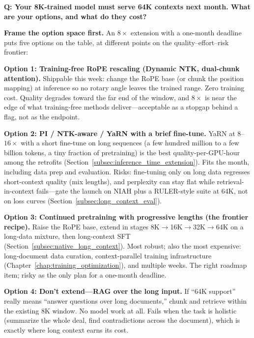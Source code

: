 \begin{interviewq}
\textbf{Q: Your 8K-trained model must serve 64K contexts next month. What are your options, and what do they cost?}

 \quad {} \quad \badgefreq{\freqhigh}

\stronganswer

\textbf{Frame the option space first.} An $8\times$ extension with a one-month deadline puts five options on the table, at different points on the quality--effort--risk frontier:

\textbf{Option 1: Training-free RoPE rescaling (Dynamic NTK, dual-chunk attention).} Shippable this week: change the RoPE base (or chunk the position mapping) at inference so no rotary angle leaves the trained range. Zero training cost. Quality degrades toward the far end of the window, and $8\times$ is near the edge of what training-free methods deliver---acceptable as a stopgap behind a flag, not as the endpoint.

\textbf{Option 2: PI / NTK-aware / YaRN with a brief fine-tune.} YaRN at $8$--$16\times$ with a short fine-tune on long sequences (a few hundred million to a few billion tokens, a tiny fraction of pretraining) is the best quality-per-GPU-hour among the retrofits (Section~\ref{subsec:inference_time_extension}). Fits the month, including data prep and evaluation. Risks: fine-tuning only on long data regresses short-context quality (mix lengths), and perplexity can stay flat while retrieval-in-context fails---gate the launch on NIAH plus a RULER-style suite at 64K, not on loss curves (Section~\ref{subsec:long_context_eval}).

\textbf{Option 3: Continued pretraining with progressive lengths (the frontier recipe).} Raise the RoPE base, extend in stages 8K$\to$16K$\to$32K$\to$64K on a long-data mixture, then long-context SFT (Section~\ref{subsec:native_long_context}). Most robust; also the most expensive: long-document data curation, context-parallel training infrastructure (Chapter~\ref{chap:training_optimization}), and multiple weeks. The right roadmap item; risky as the only plan for a one-month deadline.

\textbf{Option 4: Don't extend---RAG over the long input.} If ``64K support'' really means ``answer questions over long documents,'' chunk and retrieve within the existing 8K window. No model work at all. Fails when the task is holistic (summarize the whole deal, find contradictions across the document), which is exactly where long context earns its cost.


\end{interviewq}
